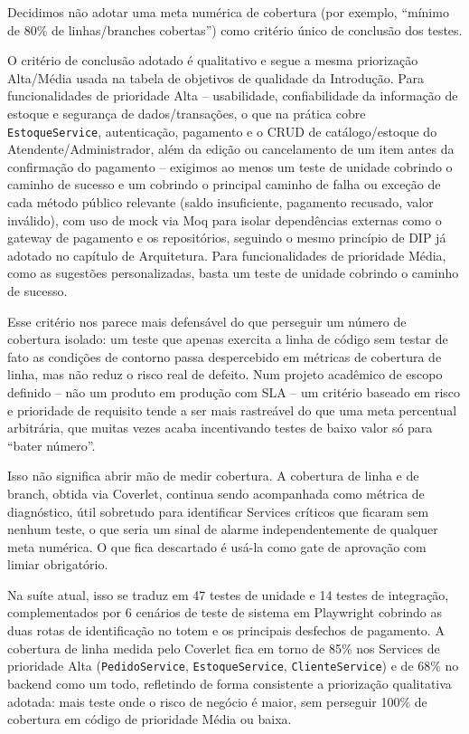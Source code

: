 \documentclass[a4paper,12pt,oneside,openany]{book}
\begin{document}
Decidimos não adotar uma meta numérica de cobertura (por exemplo, ``mínimo de 80\% de linhas/branches cobertas'') como critério único de conclusão dos testes.

O critério de conclusão adotado é qualitativo e segue a mesma priorização Alta/Média usada na tabela de objetivos de qualidade da Introdução. Para funcionalidades de prioridade Alta -- usabilidade, confiabilidade da informação de estoque e segurança de dados/transações, o que na prática cobre \texttt{EstoqueService}, autenticação, pagamento e o CRUD de catálogo/estoque do Atendente/Administrador, além da edição ou cancelamento de um item antes da confirmação do pagamento -- exigimos ao menos um teste de unidade cobrindo o caminho de sucesso e um cobrindo o principal caminho de falha ou exceção de cada método público relevante (saldo insuficiente, pagamento recusado, valor inválido), com uso de mock via Moq para isolar dependências externas como o gateway de pagamento e os repositórios, seguindo o mesmo princípio de DIP já adotado no capítulo de Arquitetura. Para funcionalidades de prioridade Média, como as sugestões personalizadas, basta um teste de unidade cobrindo o caminho de sucesso.

Esse critério nos parece mais defensável do que perseguir um número de cobertura isolado: um teste que apenas exercita a linha de código sem testar de fato as condições de contorno passa despercebido em métricas de cobertura de linha, mas não reduz o risco real de defeito. Num projeto acadêmico de escopo definido -- não um produto em produção com SLA -- um critério baseado em risco e prioridade de requisito tende a ser mais rastreável do que uma meta percentual arbitrária, que muitas vezes acaba incentivando testes de baixo valor só para ``bater número''.

Isso não significa abrir mão de medir cobertura. A cobertura de linha e de branch, obtida via Coverlet, continua sendo acompanhada como métrica de diagnóstico, útil sobretudo para identificar Services críticos que ficaram sem nenhum teste, o que seria um sinal de alarme independentemente de qualquer meta numérica. O que fica descartado é usá-la como gate de aprovação com limiar obrigatório.

Na suíte atual, isso se traduz em 47 testes de unidade e 14 testes de integração, complementados por 6 cenários de teste de sistema em Playwright cobrindo as duas rotas de identificação no totem e os principais desfechos de pagamento. A cobertura de linha medida pelo Coverlet fica em torno de 85\% nos Services de prioridade Alta (\texttt{PedidoService}, \texttt{EstoqueService}, \texttt{ClienteService}) e de 68\% no backend como um todo, refletindo de forma consistente a priorização qualitativa adotada: mais teste onde o risco de negócio é maior, sem perseguir 100\% de cobertura em código de prioridade Média ou baixa.
\end{document}
